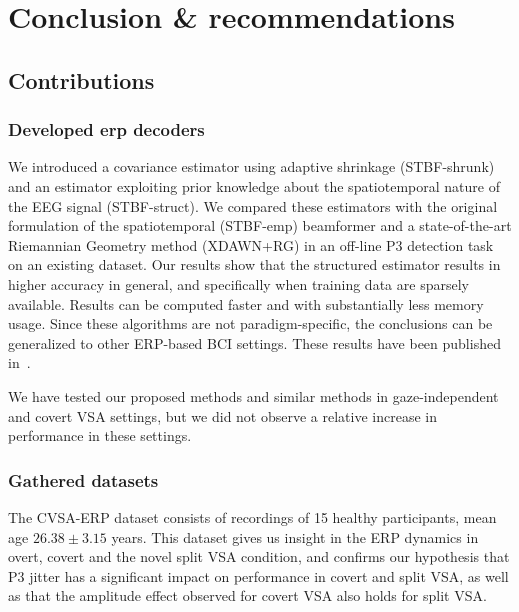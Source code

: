 \chapter{Conclusion \& recommendations}

\section{Contributions}



\subsection{Developed \Ac{erp} decoders}
We introduced a covariance estimator using adaptive shrinkage (STBF-shrunk) and an estimator
exploiting prior knowledge about the spatiotemporal nature of the EEG signal
(STBF-struct).
We compared these estimators with the original formulation of the
spatiotemporal (STBF-emp)
beamformer and a state-of-the-art Riemannian Geometry method (XDAWN+RG) in an off-line P3 detection task on
an existing dataset.
Our results show that the structured estimator results in higher accuracy in
general, and specifically when training data are sparsely available.
Results can be computed faster and with
substantially less memory usage.
Since these algorithms are not paradigm-specific, the conclusions can be
generalized to other ERP-based BCI settings.
These results have been published in~\cite{VanDenKerchove2022}.

We have tested our proposed methods and similar methods in gaze-independent and
covert VSA settings, but we did not observe a relative increase in performance
in these settings.



\subsection{Gathered datasets}
The CVSA-ERP dataset consists of recordings of 15 healthy participants, mean age
$26.38\pm3.15$ years.
This dataset gives us insight in the ERP dynamics in overt, covert and the
novel split VSA condition, and confirms our hypothesis that P3 jitter has a
significant impact on performance in covert and split VSA, as well as that the
amplitude effect observed for covert VSA also holds for split VSA.

